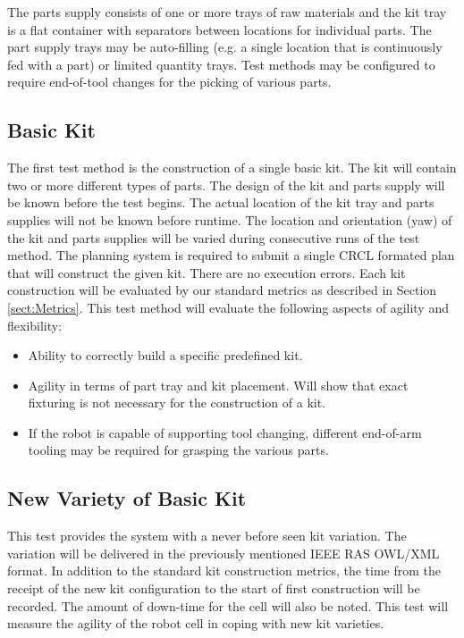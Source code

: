 The parts supply consists of one or more trays of raw materials and
the kit tray is a flat container with separators between locations for individual parts. The part supply trays may be auto-filling (e.g. 
a single location that is continuously fed with a part) or limited quantity trays. Test methods may be configured to require end-of-tool
changes for the picking of various parts.

\subsection{Basic Kit}
The first test method is the construction of a single basic kit. The kit will contain two or more different types of parts. The design of the
kit and parts supply will be known before the test begins. The actual location of the kit tray and parts supplies will not be known before
runtime. The location and orientation (yaw) of the kit and parts supplies will be varied during consecutive runs of the test method.
The planning system is required to submit a single CRCL formated plan that will construct the given kit. There are no execution errors.
Each kit construction will be evaluated by our standard metrics as described in Section \ref{sect:Metrics}. 
This test method will evaluate the following aspects of agility and flexibility:
\begin{itemize}
	\item Ability to correctly build a specific predefined kit.
	\item Agility in terms of part tray and kit placement. Will show that exact fixturing is not necessary for the construction
	of a kit.
	\item If the robot is capable of supporting tool changing, different end-of-arm tooling may be required for grasping
	the various parts.
\end{itemize}

\subsection{New Variety of Basic Kit}
This test provides the system with a never before seen kit variation. The variation will be delivered in the previously
mentioned IEEE RAS OWL/XML format. In addition to the standard kit construction metrics, the time from the receipt
of the new kit configuration to the start of first construction will be recorded. The amount of down-time for the
cell will also be noted. This test will measure the agility of the robot cell in coping with new kit varieties.

